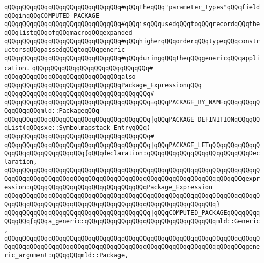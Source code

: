 \newline
\newline
\newline
\verb|qQQqqQQqqQQqqQQqqQQqqQQqqQQqqQQq#qQQqTheqQQq"parameter_types"qQQqfieldqQQqinqQQqCOMPUTED_PACKAGE|\newline
\verb|qQQqqQQqqQQqqQQqqQQqqQQqqQQqqQQq#qQQqisqQQqusedqQQqtoqQQqrecordqQQqtheqQQqlistqQQqofqQQqmacroqQQqexpanded|\newline
\verb|qQQqqQQqqQQqqQQqqQQqqQQqqQQqqQQq#qQQqhigherqQQqorderqQQqtypeqQQqconstructorsqQQqpassedqQQqtoqQQqgeneric|\newline
\verb|qQQqqQQqqQQqqQQqqQQqqQQqqQQqqQQq#qQQqduringqQQqtheqQQqgenericqQQqapplication.|\newline
\verb|qQQqqQQqqQQqqQQqqQQqqQQqqQQqqQQq#|\newline
\verb|qQQqqQQqqQQqqQQqqQQqqQQqqQQqqQQqalso|\newline
\verb|qQQqqQQqqQQqqQQqqQQqqQQqqQQqqQQqPackage_ExpressionqQQq|\newline
\verb|qQQqqQQqqQQqqQQqqQQqqQQqqQQqqQQqqQQqqQQq#|\newline
\verb|qQQqqQQqqQQqqQQqqQQqqQQqqQQqqQQqqQQqqQQq=qQQqPACKAGE_BY_NAMEqQQqqQQqqQQqqQQqqQQqmld::PackageqQQq|\newline
\verb|qQQqqQQqqQQqqQQqqQQqqQQqqQQqqQQqqQQqqQQq|\verb#|qQQqPACKAGE_DEFINITIONqQQqqQQqList(qQQqsxe::Symbolmapstack_EntryqQQq)#\newline
\verb|qQQqqQQqqQQqqQQqqQQqqQQqqQQqqQQqqQQqqQQq#|\newline
\verb|qQQqqQQqqQQqqQQqqQQqqQQqqQQqqQQqqQQqqQQq|\verb#|qQQqPACKAGE_LETqQQqqQQqqQQqqQQqqQQqqQQqqQQqqQQqqQQq{qQQqdeclaration:qQQqqQQqqQQqqQQqqQQqqQQqqQQqDeclaration,#\newline
\verb|qQQqqQQqqQQqqQQqqQQqqQQqqQQqqQQqqQQqqQQqqQQqqQQqqQQqqQQqqQQqqQQqqQQqqQQqqQQqqQQqqQQqqQQqqQQqqQQqqQQqqQQqqQQqqQQqqQQqqQQqqQQqqQQqqQQqqQQqexpression:qQQqqQQqqQQqqQQqqQQqqQQqqQQqqQQqPackage_Expression|\newline
\verb|qQQqqQQqqQQqqQQqqQQqqQQqqQQqqQQqqQQqqQQqqQQqqQQqqQQqqQQqqQQqqQQqqQQqqQQqqQQqqQQqqQQqqQQqqQQqqQQqqQQqqQQqqQQqqQQqqQQqqQQqqQQqqQQq}|\newline
\verb|qQQqqQQqqQQqqQQqqQQqqQQqqQQqqQQqqQQqqQQq|\verb#|qQQqCOMPUTED_PACKAGEqQQqqQQqqQQqqQQq{qQQqa_generic:qQQqqQQqqQQqqQQqqQQqqQQqqQQqqQQqqQQqmld::Generic,#\newline
\verb|qQQqqQQqqQQqqQQqqQQqqQQqqQQqqQQqqQQqqQQqqQQqqQQqqQQqqQQqqQQqqQQqqQQqqQQqqQQqqQQqqQQqqQQqqQQqqQQqqQQqqQQqqQQqqQQqqQQqqQQqqQQqqQQqqQQqqQQqgeneric_argument:qQQqqQQqmld::Package,|\newline
